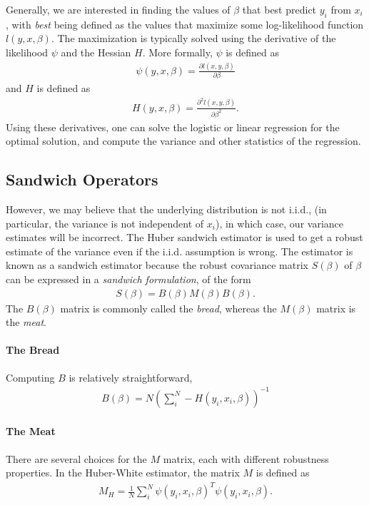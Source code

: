 Generally, we are interested in finding the values of $\beta$ that best predict $y_i$ from $x_i$, with \textit{best} being defined as the values that maximize some log-likelihood function $l(y,x,\beta)$.  The maximization is typically solved using the derivative of the likelihood $\psi$  and the Hessian $H$.  More formally, $\psi$ is defined as
\begin{align}
\psi(y,x, \beta) = \frac{\partial l(x,y,\beta)}{\partial \beta}
\end{align}
and $H$ is defined as
\begin{align}
H(y,x, \beta) = \frac{\partial^2 l(x,y,\beta)}{\partial \beta^2}.
\end{align}
Using these derivatives, one can solve the logistic or linear regression for the optimal solution, and compute the variance and other statistics of the regression.

\subsection{Sandwich Operators}
However, we may believe that the underlying distribution is not i.i.d., (in particular, the variance is not independent of $x_i$), in which case, our variance estimates will be incorrect.
 The Huber sandwich estimator is used to get a robust estimate of the variance even if the i.i.d. assumption is wrong.  The estimator is known as a sandwich estimator because the robust covariance matrix $S(\beta)$ of $\beta$ can be expressed in a \textit{sandwich formulation}, of the form
\begin{align}
S(\beta) = B(\beta) M(\beta) B(\beta).
\end{align}
The $B(\beta)$ matrix is commonly called the \textit{bread}, whereas the $M(\beta)$ matrix is the \textit{meat}.

\paragraph{The Bread}

Computing $B$ is relatively straightforward,
\begin{align}
B(\beta) = N\left(\sum_i^N -H(y_i, x_i, \beta) \right)^{-1}
\end{align}

\paragraph{The Meat}

There are several choices for the $M$ matrix, each with different robustness properties.  In the Huber-White estimator, the matrix $M$ is defined as
\begin{align}
M_{H} =\frac{1}{N} \sum_i^N \psi(y_i,x_i, \beta)^T  \psi(y_i,x_i, \beta).
\end{align}


